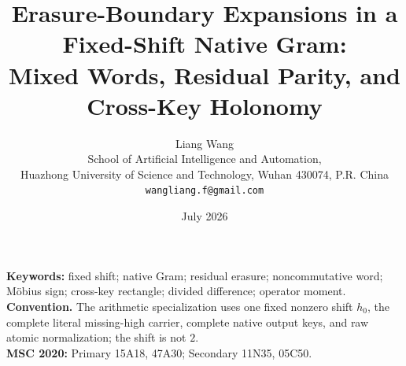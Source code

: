 \documentclass[11pt]{article}
\title{Erasure-Boundary Expansions in a Fixed-Shift Native Gram:\\
Mixed Words, Residual Parity, and Cross-Key Holonomy}
\author{Liang Wang\\
School of Artificial Intelligence and Automation,\\
Huazhong University of Science and Technology, Wuhan 430074, P.R. China\\
\texttt{wangliang.f@gmail.com}}
\date{July 2026}
\theoremstyle{remark}
\begin{document}
\maketitle


\noindent\textbf{Keywords:} fixed shift; native Gram; residual erasure;
noncommutative word; Möbius sign; cross-key rectangle; divided difference;
operator moment.\\[0.5em]
\noindent\textbf{Convention.} The arithmetic specialization uses one fixed
nonzero shift \(h_0\), the complete literal missing-high carrier, complete
native output keys, and raw atomic normalization; the shift is not \(2\).\\[0.5em]
\noindent\textbf{MSC 2020:} Primary 15A18, 47A30; Secondary 11N35, 05C50.













\begingroup
\small
\raggedright


\endgroup
\end{document}
